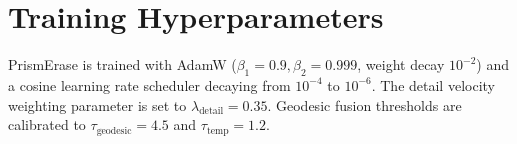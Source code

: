 \documentclass[11pt,a4paper]{article}
\begin{document}
\section{Training Hyperparameters}
\label{app:hyperparams}
PrismErase is trained with AdamW ($\beta_1 = 0.9, \beta_2 = 0.999$, weight decay $10^{-2}$) and a cosine learning rate scheduler decaying from $10^{-4}$ to $10^{-6}$. The detail velocity weighting parameter is set to $\lambda_{\text{detail}} = 0.35$. Geodesic fusion thresholds are calibrated to $\tau_{\text{geodesic}} = 4.5$ and $\tau_{\text{temp}} = 1.2$.



\end{document}
